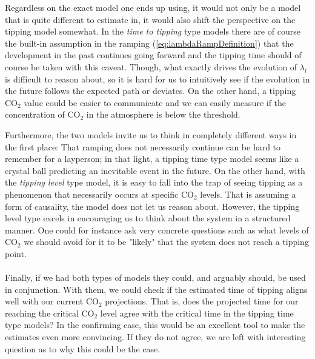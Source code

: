 Regardless on the exact model one ends up using, it would not only be a model that is quite different to estimate in, it would also shift the perspective on the tipping model somewhat. In the \textit{time to tipping} type models there are of course the built-in assumption in the ramping (\ref{eq:lambdaRampDefinition}) that the development in the past continues going forward and the tipping time should of course be taken with this caveat. Though, what exactly drives the evolution of $\lambda_t$ is difficult to reason about, so it is hard for us to intuitively see if the evolution in the future follows the expected path or deviates. On the other hand, a tipping $\mathrm{CO}_2$ value could be easier to communicate and we can easily measure if the concentration of $\mathrm{CO}_2$ in the atmosphere is below the threshold. 

Furthermore, the two models invite us to think in completely different ways in the first place: That ramping does not necessarily continue can be hard to remember for a layperson; in that light, a tipping time type model seems like a crystal ball predicting an inevitable event in the future. On the other hand, with the \textit{tipping level} type model, it is easy to fall into the trap of seeing tipping as a phenomenon that necessarily occurs at specific $\mathrm{CO}_2$ levels. That is assuming a form of causality, the model does not let us reason about. However, the tipping level type excels in encouraging us to think about the system in a structured manner. One could for instance ask very concrete questions such as what levels of $\mathrm{CO}_2$ we should avoid for it to be "likely" that the system does not reach a tipping point. \\\\
Finally, if we had both types of models they could, and arguably should, be used in conjunction. With them, we could check if the estimated time of tipping aligns well with our current $\mathrm{CO}_2$ projections. That is, does the projected time for our reaching the critical $\mathrm{CO}_2$ level agree with the critical time in the tipping time type models? In the confirming case, this would be an excellent tool to make the estimates even more convincing. If they do not agree, we are left with interesting question as to why this could be the case.

